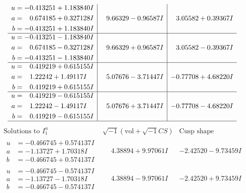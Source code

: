 \documentclass[1p]{elsarticle_modified}
\theoremstyle{definition}
\newcommand{\I}{\sqrt{-1}}
\begin{document}
$$\begin{array}{c|c|c}
\begin{aligned}
u &= -0.413251 + 1.183840 I \\
a &= \phantom{-}0.674185 + 0.327128 I \\
b &= -0.413251 + 1.183840 I\end{aligned}
 & \phantom{-}9.66329 - 0.96587 I & \phantom{-}3.05582 + 0.39367 I \\ \hline\begin{aligned}
u &= -0.413251 - 1.183840 I \\
a &= \phantom{-}0.674185 - 0.327128 I \\
b &= -0.413251 - 1.183840 I\end{aligned}
 & \phantom{-}9.66329 + 0.96587 I & \phantom{-}3.05582 - 0.39367 I \\ \hline\begin{aligned}
u &= \phantom{-}0.419219 + 0.615155 I \\
a &= \phantom{-}1.22242 + 1.49117 I \\
b &= \phantom{-}0.419219 + 0.615155 I\end{aligned}
 & \phantom{-}5.07676 - 3.71447 I & -0.77708 + 4.68220 I \\ \hline\begin{aligned}
u &= \phantom{-}0.419219 - 0.615155 I \\
a &= \phantom{-}1.22242 - 1.49117 I \\
b &= \phantom{-}0.419219 - 0.615155 I\end{aligned}
 & \phantom{-}5.07676 + 3.71447 I & -0.77708 - 4.68220 I\\
 \hline 
 \end{array}$$\newpage$$\begin{array}{c|c|c}  
\text{Solutions to }I^u_{1}& \I (\text{vol} + \sqrt{-1}CS) & \text{Cusp shape}\\
 \hline 
\begin{aligned}
u &= -0.466745 + 0.574137 I \\
a &= -1.13727 + 1.70318 I \\
b &= -0.466745 + 0.574137 I\end{aligned}
 & \phantom{-}4.38894 + 9.97061 I & -2.42520 - 9.73459 I \\ \hline\begin{aligned}
u &= -0.466745 - 0.574137 I \\
a &= -1.13727 - 1.70318 I \\
b &= -0.466745 - 0.574137 I\end{aligned}
 & \phantom{-}4.38894 - 9.97061 I & -2.42520 + 9.73459 I \\ \hline\begin{aligned}

\end{aligned}
\end{array}$$
\end{document}
